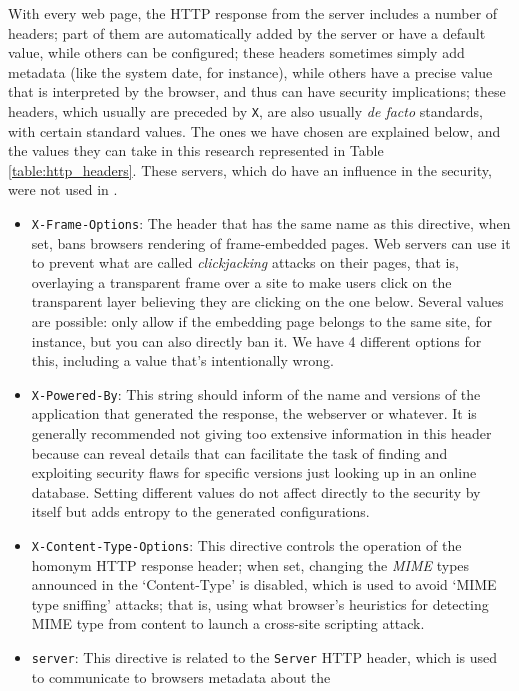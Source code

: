 \documentclass[sigconf]{acmart}
\begin{document}
With every web page, the HTTP response from the server includes a
number of headers; part of them are automatically added by the server
or have a default value, while others can be configured; these headers
sometimes simply add metadata (like the system date, for instance),
while others have a precise value that is interpreted by the browser,
and thus can have security implications; these headers, which usually
are preceded by {\tt X}, are also usually {\em de facto} standards,
with certain standard values. The ones we have chosen are explained
below, and the values they can take in this research represented in
Table \ref{table:http_headers}. These servers, which do have an
influence in the security, were not used in
\cite{john_evolutionary_2014}.
\begin{itemize}
\item \texttt{X-Frame-Options}: The header that has the same name as this
directive, when set, bans browsers rendering of frame-embedded pages. Web servers can use it to prevent what are called
\textit{clickjacking} attacks on their pages, that is, overlaying a
transparent frame over a site to make users click on the transparent
layer believing they are clicking on the one below. Several values are
possible: only allow if the embedding page belongs to the same site,
for instance, but you can also directly ban it. We have 4 different
options for this, including a value that's intentionally wrong.
\item \texttt{X-Powered-By}: This string should inform of the
name and versions of the application that generated the response, the
webserver or whatever. It
is generally recommended not giving too extensive information in this
header because can reveal details that can facilitate the task of
finding and exploiting security flaws for specific versions just
looking up in an online database. Setting different values do not affect directly to the
security by itself but adds entropy to the generated configurations.
\item
\texttt{X-Content-Type-Options}: This directive controls the operation
of the homonym HTTP response header; when set,  changing the \textit{MIME} types
announced in the `Content-Type' is disabled, which is used to avoid
`MIME type sniffing' attacks; that is, using what browser's heuristics
for detecting MIME type from content to launch a cross-site scripting
attack.
\item
\texttt{server}: This directive is related to the {\tt Server} HTTP
header, which is used to communicate to browsers metadata about the

\end{itemize}
\end{document}
